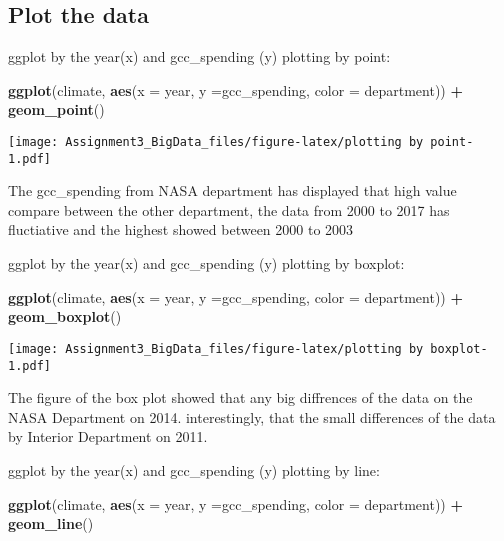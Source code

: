 \documentclass[]{article}
\newenvironment{Shaded}{\begin{snugshade}}{\end{snugshade}}
\newcommand{\KeywordTok}[1]{\textcolor[rgb]{0.13,0.29,0.53}{\textbf{#1}}}
\newcommand{\DataTypeTok}[1]{\textcolor[rgb]{0.13,0.29,0.53}{#1}}
\newcommand{\StringTok}[1]{\textcolor[rgb]{0.31,0.60,0.02}{#1}}
\newcommand{\OperatorTok}[1]{\textcolor[rgb]{0.81,0.36,0.00}{\textbf{#1}}}
\newcommand{\NormalTok}[1]{#1}
\begin{document}
\subsection{Plot the data}\label{plot-the-data}

ggplot by the year(x) and gcc\_spending (y) plotting by point:

\begin{Shaded}
\begin{Highlighting}[]
\KeywordTok{ggplot}\NormalTok{(climate, }\KeywordTok{aes}\NormalTok{(}\DataTypeTok{x =}\NormalTok{ year, }\DataTypeTok{y =}\NormalTok{gcc_spending, }\DataTypeTok{color =}\NormalTok{ department)) }\OperatorTok{+}
\StringTok{  }\KeywordTok{geom_point}\NormalTok{()}
\end{Highlighting}
\end{Shaded}

\texttt{[image: Assignment3\_BigData\_files/figure-latex/plotting by point-1.pdf]}

The gcc\_spending from NASA department has displayed that high value
compare between the other department, the data from 2000 to 2017 has
fluctiative and the highest showed between 2000 to 2003

ggplot by the year(x) and gcc\_spending (y) plotting by boxplot:

\begin{Shaded}
\begin{Highlighting}[]
\KeywordTok{ggplot}\NormalTok{(climate, }\KeywordTok{aes}\NormalTok{(}\DataTypeTok{x =}\NormalTok{ year, }\DataTypeTok{y =}\NormalTok{gcc_spending, }\DataTypeTok{color =}\NormalTok{ department)) }\OperatorTok{+}
\StringTok{  }\KeywordTok{geom_boxplot}\NormalTok{()}
\end{Highlighting}
\end{Shaded}

\texttt{[image: Assignment3\_BigData\_files/figure-latex/plotting by boxplot-1.pdf]}

The figure of the box plot showed that any big diffrences of the data on
the NASA Department on 2014. interestingly, that the small differences
of the data by Interior Department on 2011.

ggplot by the year(x) and gcc\_spending (y) plotting by line:

\begin{Shaded}
\begin{Highlighting}[]
\KeywordTok{ggplot}\NormalTok{(climate, }\KeywordTok{aes}\NormalTok{(}\DataTypeTok{x =}\NormalTok{ year, }\DataTypeTok{y =}\NormalTok{gcc_spending, }\DataTypeTok{color =}\NormalTok{ department)) }\OperatorTok{+}
\StringTok{  }\KeywordTok{geom_line}\NormalTok{()}
\end{Highlighting}
\end{Shaded}
\end{document}
